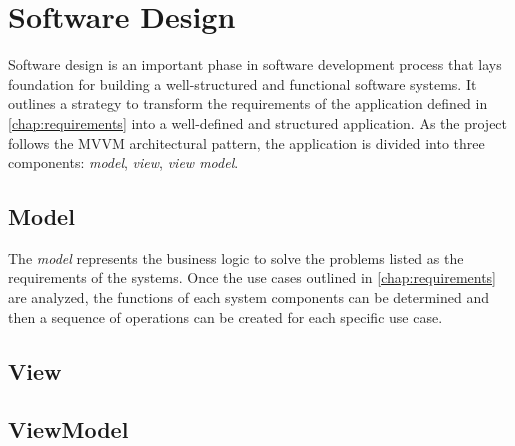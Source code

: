 \section{Software Design}
Software design is an important phase in software development process that lays foundation for building a well-structured and functional software systems. 
It outlines a strategy to transform the requirements of the application defined in \autoref{chap:requirements} into a well-defined and structured application.
As the project follows the MVVM architectural pattern, the application is divided into three components: \emph{model}, \emph{view}, \emph{view model}. 

\subsection{Model}
The \emph{model} represents the business logic to solve the problems listed as the requirements of the systems. Once the use cases outlined in \autoref{chap:requirements} are analyzed, the functions of each system components can be determined and then a sequence of operations can be created for each specific use case.

\subsection{View}
\subsection{ViewModel}